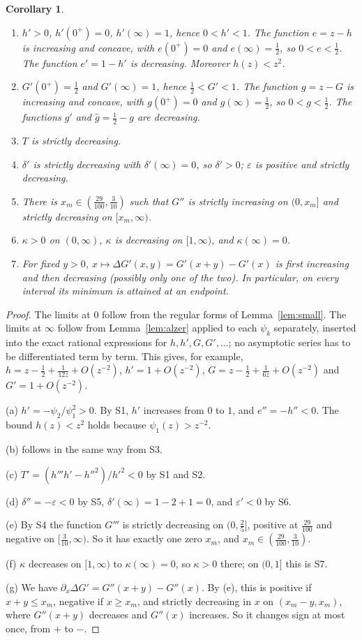 \documentclass[11pt,a4paper]{article}
\newtheorem{corollary}[theorem]{Corollary}
\theoremstyle{definition}
\theoremstyle{remark}
\newcommand{\eps}{\varepsilon}
\begin{document}
\begin{corollary}\label{cor:derived}
\begin{enumerate}[label=\textup{(\alph*)}]
\item $h'>0$, $h'(0^+)=0$, $h'(\infty)=1$, hence $0<h'<1$. The function $e=z-h$ is increasing and concave, with $e(0^+)=0$ and $e(\infty)=\frac12$, so $0<e<\frac12$. The function $e'=1-h'$ is decreasing. Moreover $h(z)<z^2$.
\item $G'(0^+)=\frac12$ and $G'(\infty)=1$, hence $\frac12<G'<1$. The function $g=z-G$ is increasing and concave, with $g(0^+)=0$ and $g(\infty)=\frac12$, so $0<g<\frac12$. The functions $g'$ and $\hat g=\frac12-g$ are decreasing.
\item $T$ is strictly decreasing.
\item $\delta'$ is strictly decreasing with $\delta'(\infty)=0$, so $\delta'>0$; $\eps$ is positive and strictly decreasing.
\item There is $x_m\in(\frac{29}{100},\frac3{10})$ such that $G''$ is strictly increasing on $(0,x_m]$ and strictly decreasing on $[x_m,\infty)$.
\item $\kappa>0$ on $(0,\infty)$, $\kappa$ is decreasing on $[1,\infty)$, and $\kappa(\infty)=0$.
\item For fixed $y>0$, $x\mapsto\Delta G'(x,y)=G'(x+y)-G'(x)$ is first increasing and then decreasing (possibly only one of the two). In particular, on every interval its minimum is attained at an endpoint.
\end{enumerate}
\end{corollary}
\begin{proof}
The limits at $0$ follow from the regular forms of Lemma~\ref{lem:small}. The limits at $\infty$ follow from Lemma~\ref{lem:alzer} applied to each $\psi_k$ separately, inserted into the exact rational expressions for $h,h',G,G',\dots$; no asymptotic series has to be differentiated term by term. This gives, for example, $h=z-\frac12+\frac1{12z}+O(z^{-2})$, $h'=1+O(z^{-2})$, $G=z-\frac12+\frac1{6z}+O(z^{-2})$ and $G'=1+O(z^{-2})$.

(a) $h'=-\psi_2/\psi_1^2>0$. By S1, $h'$ increases from $0$ to $1$, and $e''=-h''<0$. The bound $h(z)<z^2$ holds because $\psi_1(z)>z^{-2}$.

(b) follows in the same way from S3.

(c) $T'=(h'''h'-h''^2)/h'^2<0$ by S1 and S2.

(d) $\delta''=-\eps<0$ by S5, $\delta'(\infty)=1-2+1=0$, and $\eps'<0$ by S6.

(e) By S4 the function $G'''$ is strictly decreasing on $(0,\frac25]$, positive at $\frac{29}{100}$ and negative on $[\frac3{10},\infty)$. So it has exactly one zero $x_m$, and $x_m\in(\frac{29}{100},\frac3{10})$.

(f) $\kappa$ decreases on $[1,\infty)$ to $\kappa(\infty)=0$, so $\kappa>0$ there; on $(0,1]$ this is S7.

(g) We have $\partial_x\Delta G'=G''(x+y)-G''(x)$. By (e), this is positive if $x+y\le x_m$, negative if $x\ge x_m$, and strictly decreasing in $x$ on $(x_m-y,x_m)$, where $G''(x+y)$ decreases and $G''(x)$ increases. So it changes sign at most once, from $+$ to $-$.
\end{proof}
\end{document}
